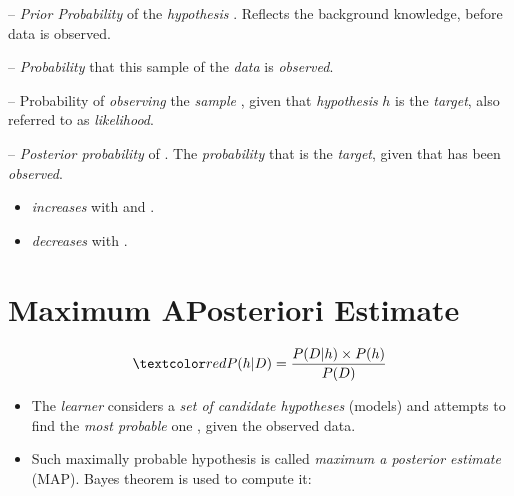 \documentclass[
	number={3},
	title={Na\:ive Bayes Learning}
]{cs584notes}
\begin{document}
\begin{description}[font=\color{red}]
	\item[$P(h)$] -- \emph{Prior Probability} of the \emph{hypothesis} . Reflects the background knowledge, before data is observed.
	\item[$P(D)$] -- \emph{Probability} that this sample of the \emph{data} is \emph{observed}.
	\item[$P(D|h)$] -- {Probability} of \emph{observing} the \emph{sample} , given that \emph{hypothesis} $h$ is the \emph{target}, also referred to as \emph{likelihood}.
	\item[$P(h|D)$] -- \emph{Posterior probability} of . The \emph{probability} that  is the \emph{target}, given that  has been \emph{observed}.
\end{description}

\begin{itemize}
	\item {} \emph{increases} with  and .
	\item {} \emph{decreases} with .
\end{itemize}

\section{Maximum APosteriori Estimate}\label{sec:maximum-aposteriori-estimate}
\[ \data{ P(h|D) = \frac{P(D|h)\times P(h)}{P(D)} } \]
\begin{itemize}
	\item The \emph{learner} considers a \emph{set of candidate hypotheses}  (models) and attempts to find the \emph{most probable} one , given the observed data.
	\item Such maximally probable hypothesis is called \emph{maximum a posterior estimate} (MAP). Bayes theorem is used to compute it:
	\data{\begin{equation*}
	\begin{aligned}
		h_{MAP} &= \arg\max_{h\in H}P(h|D)\\
				&= \arg\max_{h\in H}\frac{P(D|h)\times P(h)}{P(D)}\\
				&= \arg\max_{h\in H}P(D|h)\times P(h)\\%
	\end{aligned}
	\end{equation*}}
\end{itemize}
\end{document}
